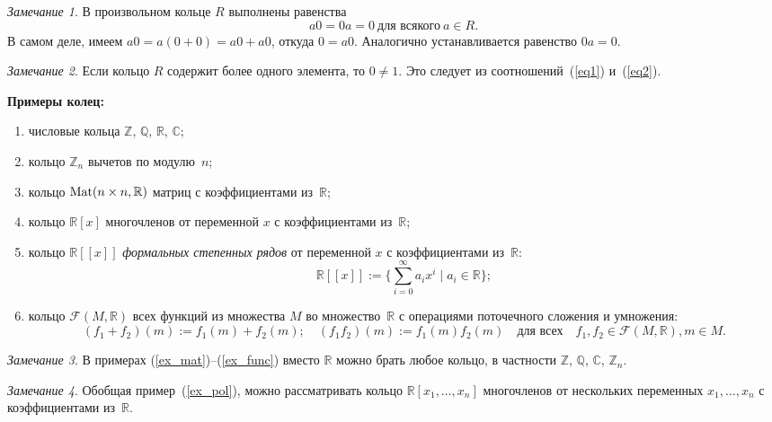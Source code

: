 \documentclass[a4paper, 12pt]{article}
\def\Mat{{\rm Mat}}%
\def\CC{{\mathbb C}}%
\def\ZZ{{\mathbb Z}}%
\def\RR{{\mathbb R}}%
\def\QQ{{\mathbb Q}}%
\def\FFF{\mathcal{F}}
\def\Mat{{\rm Mat}}
\theoremstyle{definition}
\theoremstyle{remark}
\newtheorem{remark}{Замечание}
\begin{document}
\begin{remark}
В произвольном кольце $R$ выполнены равенства
\begin{equation} \label{eq2}
a0 = 0a = 0 \ \text{для всякого} \ a \in R.
\end{equation}
В самом деле, имеем $a0 = a(0 + 0) = a0 + a0$, откуда $0 = a0$.
Аналогично устанавливается равенство $0a = 0$.
\end{remark}

\begin{remark}
Если кольцо $R$ содержит более одного элемента, то $0\ne 1$. Это
следует из соотношений~(\ref{eq1}) и~(\ref{eq2}).
\end{remark}

\textbf{Примеры колец:}
\begin{enumerate}[label=\textup{(\arabic*)},ref=\textup{\arabic*}]
\item \label{ex_num}
числовые кольца $\ZZ$, $\QQ$, $\RR$, $\CC$;

\item
кольцо $\ZZ_n$ вычетов по модулю~$n$;

\item \label{ex_mat}
кольцо $\Mat(n\times n, \RR)$ матриц с коэффициентами из~$\RR$;

\item \label{ex_pol}
кольцо $\RR[x]$ многочленов от переменной $x$ с коэффициентами
из~$\RR$;

\item
кольцо $\RR[[x]]$ \textit{формальных степенных рядов} от переменной
$x$ с коэффициентами из~$\RR$:
$$
\RR[[x]] := \lbrace \sum \limits_{i = 0}^\infty a_i x^i \mid a_i \in
\RR \rbrace;
$$

\item \label{ex_func}
кольцо $\FFF(M, \RR)$ всех функций из множества $M$ во
множество~$\RR$ с операциями поточечного сложения и умножения:
$$
(f_1 + f_2)(m) := f_1(m) + f_2(m); \quad (f_1f_2)(m) := f_1(m)
f_2(m) \quad \text{для всех} \quad f_1,f_2 \in \FFF(M, \RR), m \in
M.
$$
\end{enumerate}

\begin{remark}
В примерах (\ref{ex_mat})--(\ref{ex_func}) вместо $\RR$ можно брать
любое кольцо, в частности $\ZZ$, $\QQ$, $\CC$, $\ZZ_n$.
\end{remark}

\begin{remark}
Обобщая пример~(\ref{ex_pol}), можно рассматривать кольцо $\RR[x_1,
\ldots, x_n]$ многочленов от нескольких переменных $x_1, \ldots,
x_n$ с коэффициентами из~$\RR$.
\end{remark}
\end{document}
